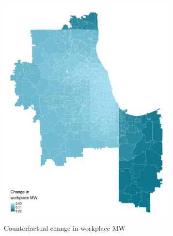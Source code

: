 \documentclass[aspectratio=169, t]{beamer}
\begin{document}
\begin{frame}
\begin{figure}
\begin{subfigure}{0.33\textwidth}
                         \includegraphics[width = 0.99\textwidth]{counterfactuals/output/chicago_d_mw_wkp.png}
            \caption*{Counterfactual change in workplace MW}
        \end{subfigure}
        \begin{subfigure}{0.33\textwidth}

\end{subfigure}
\end{figure}
\end{frame}
\end{document}
